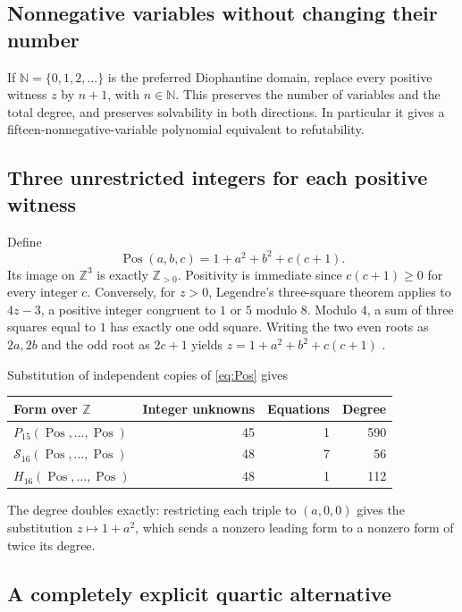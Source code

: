 \documentclass[11pt,a4paper]{article}
\theoremstyle{remark}
\newcommand{\Z}{\mathbb Z}
\newcommand{\N}{\mathbb N}
\newcommand{\Zp}{\mathbb Z_{>0}}
\begin{document}
\subsection{Nonnegative variables without changing their number}

If $\N=\{0,1,2,\ldots\}$ is the preferred Diophantine domain, replace
every positive witness $z$ by $n+1$, with $n\in\N$. This preserves
the number of variables and the total degree, and preserves solvability
in both directions. In particular it gives a fifteen-nonnegative-variable
polynomial equivalent to refutability.

\subsection{Three unrestricted integers for each positive witness}

Define
\begin{equation}
 \operatorname{Pos}(a,b,c)=1+a^2+b^2+c(c+1).
\label{eq:Pos}
\end{equation}
Its image on $\Z^3$ is exactly $\Zp$. Positivity is immediate since
$c(c+1)\ge0$ for every integer $c$. Conversely, for $z>0$, Legendre's
three-square theorem applies to $4z-3$, a positive integer congruent
to $1$ or $5$ modulo $8$. Modulo $4$, a sum of three squares equal
to $1$ has exactly one odd square. Writing the two even roots as
$2a,2b$ and the odd root as $2c+1$ yields
$z=1+a^2+b^2+c(c+1)$ \cite{legendre}.

Substitution of independent copies of \eqref{eq:Pos} gives
\begin{center}
\begin{tabular}{lrrr}
\toprule
Form over $\Z$ & Integer unknowns & Equations & Degree\\
\midrule
$P_{15}(\operatorname{Pos},\ldots,\operatorname{Pos})$ & 45 & 1 & 590\\
$\mathcal S_{16}(\operatorname{Pos},\ldots,\operatorname{Pos})$ & 48 & 7 & 56\\
$H_{16}(\operatorname{Pos},\ldots,\operatorname{Pos})$ & 48 & 1 & 112\\
\bottomrule
\end{tabular}
\end{center}
The degree doubles exactly: restricting each triple to $(a,0,0)$ gives
the substitution $z\mapsto1+a^2$, which sends a nonzero leading form
to a nonzero form of twice its degree.

\subsection{A completely explicit quartic alternative}
\end{document}
